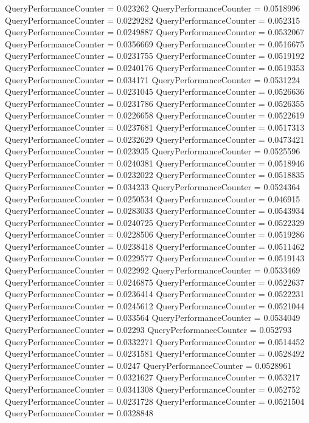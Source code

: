 \documentclass[9pt]{article}
\theoremstyle{plain}
\theoremstyle{definition}
\theoremstyle{remark}
\numberwithin{equation}{section}
\begin{document}
QueryPerformanceCounter  =  0.023262
QueryPerformanceCounter  =  0.0518996
QueryPerformanceCounter  =  0.0229282
QueryPerformanceCounter  =  0.052315
QueryPerformanceCounter  =  0.0249887
QueryPerformanceCounter  =  0.0532067
QueryPerformanceCounter  =  0.0356669
QueryPerformanceCounter  =  0.0516675
QueryPerformanceCounter  =  0.0231755
QueryPerformanceCounter  =  0.0519192
QueryPerformanceCounter  =  0.0240176
QueryPerformanceCounter  =  0.0519353
QueryPerformanceCounter  =  0.034171
QueryPerformanceCounter  =  0.0531224
QueryPerformanceCounter  =  0.0231045
QueryPerformanceCounter  =  0.0526636
QueryPerformanceCounter  =  0.0231786
QueryPerformanceCounter  =  0.0526355
QueryPerformanceCounter  =  0.0226658
QueryPerformanceCounter  =  0.0522619
QueryPerformanceCounter  =  0.0237681
QueryPerformanceCounter  =  0.0517313
QueryPerformanceCounter  =  0.0232629
QueryPerformanceCounter  =  0.0473421
QueryPerformanceCounter  =  0.023935
QueryPerformanceCounter  =  0.0525596
QueryPerformanceCounter  =  0.0240381
QueryPerformanceCounter  =  0.0518946
QueryPerformanceCounter  =  0.0232022
QueryPerformanceCounter  =  0.0518835
QueryPerformanceCounter  =  0.034233
QueryPerformanceCounter  =  0.0524364
QueryPerformanceCounter  =  0.0250534
QueryPerformanceCounter  =  0.046915
QueryPerformanceCounter  =  0.0283033
QueryPerformanceCounter  =  0.0543934
QueryPerformanceCounter  =  0.0240725
QueryPerformanceCounter  =  0.0522329
QueryPerformanceCounter  =  0.0228506
QueryPerformanceCounter  =  0.0519286
QueryPerformanceCounter  =  0.0238418
QueryPerformanceCounter  =  0.0511462
QueryPerformanceCounter  =  0.0229577
QueryPerformanceCounter  =  0.0519143
QueryPerformanceCounter  =  0.022992
QueryPerformanceCounter  =  0.0533469
QueryPerformanceCounter  =  0.0246875
QueryPerformanceCounter  =  0.0522637
QueryPerformanceCounter  =  0.0236414
QueryPerformanceCounter  =  0.0522231
QueryPerformanceCounter  =  0.0245612
QueryPerformanceCounter  =  0.0521044
QueryPerformanceCounter  =  0.033564
QueryPerformanceCounter  =  0.0534049
QueryPerformanceCounter  =  0.02293
QueryPerformanceCounter  =  0.052793
QueryPerformanceCounter  =  0.0332271
QueryPerformanceCounter  =  0.0514452
QueryPerformanceCounter  =  0.0231581
QueryPerformanceCounter  =  0.0528492
QueryPerformanceCounter  =  0.0247
QueryPerformanceCounter  =  0.0528961
QueryPerformanceCounter  =  0.0321627
QueryPerformanceCounter  =  0.053217
QueryPerformanceCounter  =  0.0341308
QueryPerformanceCounter  =  0.052752
QueryPerformanceCounter  =  0.0231728
QueryPerformanceCounter  =  0.0521504
QueryPerformanceCounter  =  0.0328848
\end{document}

